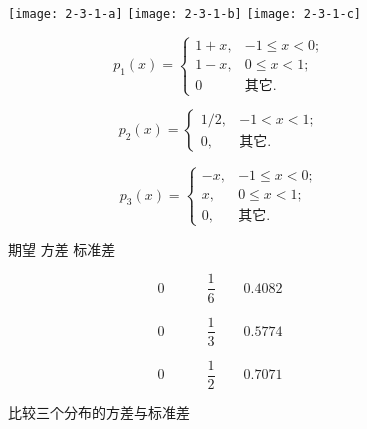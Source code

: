\begin{figure}[h!]
	\begin{minipage}{0.3\textwidth}
		\texttt{[image: 2-3-1-a]}
		\texttt{[image: 2-3-1-b]}
		\texttt{[image: 2-3-1-c]}
	\end{minipage}
	\begin{minipage}{0.3\textwidth}
		
		\[
		p_{1}(x)=\left\{\begin{array}{ll}
		{1+x,} & {-1 \leqslant x<0 ;} \\ 
		{1-x,} & {0 \leqslant x<1 ;} \\ 
		{0}    & {\text{其它.}}
		\end{array}\right.
		\]
		
		\[
		p_{2}(x)=\left\{\begin{array}{ll}
		{1 / 2,} & {-1<x<1 ;} \\ 
		{0,}     & {\text{其它.}}
		\end{array}\right.
		\]
		
		\[
		p_{3}(x)=\left\{\begin{array}{ll}
		{-x,} & {-1 \leqslant x<0 ;} \\ 
		{x,}  & {0 \leqslant x<1 ;}   \\ 
		{0,}  & {\text{其它.}}
		\end{array}\right.
		\]
		
	\end{minipage}\qquad \quad
	\begin{minipage}{0.3\textwidth}
		
		\vspace{-5ex}
		\begin{center}
			期望 \quad 方差 \quad 标准差
		\end{center}
		
		\vspace*{-2ex}
		
		\[
		{0 \qquad \quad \frac{1}{6} \qquad 0.4082}
		\]
		
		\vspace{3ex}
		
		\[
		{0 \qquad \quad \frac{1}{3} \qquad 0.5774}
		\]
		
		
		\vspace{3ex} 
		
		\[
		{0 \qquad \quad \frac{1}{2} \qquad 0.7071} 
		\]
		
		
	\end{minipage}
	\caption{比较三个分布的方差与标准差}
	\label{fig:2.3.1}
\end{figure}

